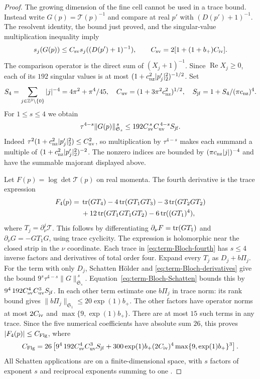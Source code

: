 \begin{proof}
The growing dimension of the fine cell cannot be used
in a trace bound. Instead write $G(p)=\mathcal T(p)^{-1}$
and compare at real $p'$ with $(D(p')+1)^{-1}$.
The resolvent identity, the bound just proved, and the
singular-value multiplication inequality
\cite[slides~3--9]{PongeSchatten2025} imply
\[
 s_j(G(p))\le C_{\rm sv}s_j((D(p')+1)^{-1}),\qquad
 C_{\rm sv}=2[1+(1+b_+)C_{\rm iv}].
\]
The comparison operator is the direct sum of
$(X_j+1)^{-1}$. Since $\operatorname{Re}X_j\ge0$,
each of its $192$ singular values is at most
$(1+c_{\rm nz}^2|p'_j|_2^2)^{-1/2}$.
Set
\[
 S_4=\sum_{j\in\mathbb Z^3\setminus\{0\}}|j|^{-4}
        =4\pi^2+\pi^4/45,\quad
 C_{\rm uv}=(1+3\pi^2c_{\rm nz}^2)^{1/2},\quad
 S_{\rm jf}=1+S_4/(\pi c_{\rm nz})^4.
\]
For $1\le s\le4$ we obtain
\begin{equation}\label{eq:term-Bloch-Schatten}
 \tau^{4-s}\|G(p)\|_{\mathfrak S_s}^{\,s}
           \le192C_{\rm sv}^{\,s}C_{\rm uv}^{\,4-s}S_{\rm jf}.
\end{equation}
Indeed
$\tau^2(1+c_{\rm nz}^2|p'_j|_2^2)\le C_{\rm uv}^2$,
so multiplication by $\tau^{4-s}$ makes each summand
a multiple of $(1+c_{\rm nz}^2|p'_j|_2^2)^{-2}$.
The nonzero indices are bounded by
$(\pi c_{\rm nz}|j|)^{-4}$ and have the summable
majorant displayed above.

Let $F(p)=\log\det\mathcal T(p)$ on real momenta.
The fourth derivative is the trace expression
\begin{align}
 F_4(p)={}&\operatorname{tr}(GT_4)-4\operatorname{tr}(GT_1GT_3)
                  -3\operatorname{tr}(GT_2GT_2)\nonumber\\
          &+12\operatorname{tr}(GT_1GT_1GT_2)-6\operatorname{tr}((GT_1)^4),
                                      \label{eq:term-Bloch-fourth}
\end{align}
where $T_j=\partial_\nu^j\mathcal T$.
This follows by differentiating
$\partial_\nu F=\operatorname{tr}(GT_1)$ and
$\partial_\nu G=-GT_1G$, using trace cyclicity.
The expression is holomorphic near the closed strip
in the $\nu$ coordinate.
Each trace in \eqref{eq:term-Bloch-fourth} has $s\le4$
inverse factors and derivatives of total order four.
Expand every $T_j$ as $D_j+b\Pi_j$.
For the term with only $D_j$, Schatten Hölder and
\eqref{eq:term-Bloch-derivatives} give the bound
$9^s\tau^{4-s}\|G\|_{\mathfrak S_s}^{\,s}$.
Equation~\eqref{eq:term-Bloch-Schatten} bounds this by
$9^4\,192C_{\rm sv}^4C_{\rm uv}^3S_{\rm jf}$.
In each other term estimate one $b\Pi_j$ in trace norm:
its rank bound gives $\|b\Pi_j\|_{\mathfrak S_1}
\le20\exp(1)b_+$. The other factors have operator
norms at most $2C_{\rm iv}$ and
$\max\{9,\exp(1)b_+\}$.
There are at most $15$ such terms in any trace.
Since the five numerical coefficients have absolute
sum $26$, this proves $|F_4(p)|\le C_{\rm Flg}$, where
\[
 C_{\rm Flg}=26\left[
       9^4\,192C_{\rm sv}^4C_{\rm uv}^3S_{\rm jf}
       +300\exp(1)b_+(2C_{\rm iv})^4
                           \max\{9,\exp(1)b_+\}^3\right].
\]
All Schatten applications are on a finite-dimensional
space, with $s$ factors of exponent $s$ and reciprocal
exponents summing to one
\cite[slides~54--56]{PongeSchatten2025}.


\end{proof}
